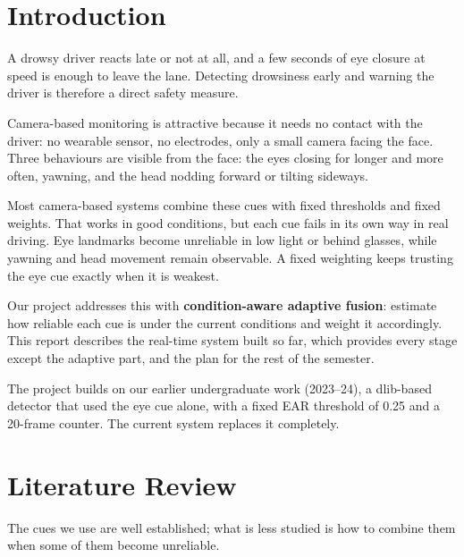 \documentclass[12pt,a4paper]{article}
\begin{document}
\newpage
\begin{singlespace}
\tableofcontents
\end{singlespace}
\newpage

\section{Introduction}

A drowsy driver reacts late or not at all, and a few seconds of eye closure at speed is enough to leave the lane. Detecting drowsiness early and warning the driver is therefore a direct safety measure.

Camera-based monitoring is attractive because it needs no contact with the driver: no wearable sensor, no electrodes, only a small camera facing the face. Three behaviours are visible from the face: the eyes closing for longer and more often, yawning, and the head nodding forward or tilting sideways.

Most camera-based systems combine these cues with fixed thresholds and fixed weights. That works in good conditions, but each cue fails in its own way in real driving. Eye landmarks become unreliable in low light or behind glasses, while yawning and head movement remain observable. A fixed weighting keeps trusting the eye cue exactly when it is weakest.

Our project addresses this with \textbf{condition-aware adaptive fusion}: estimate how reliable each cue is under the current conditions and weight it accordingly. This report describes the real-time system built so far, which provides every stage except the adaptive part, and the plan for the rest of the semester.

The project builds on our earlier undergraduate work (2023--24), a dlib-based detector that used the eye cue alone, with a fixed EAR threshold of 0.25 and a 20-frame counter. The current system replaces it completely.

\section{Literature Review}

The cues we use are well established; what is less studied is how to combine them when some of them become unreliable.
\end{document}
